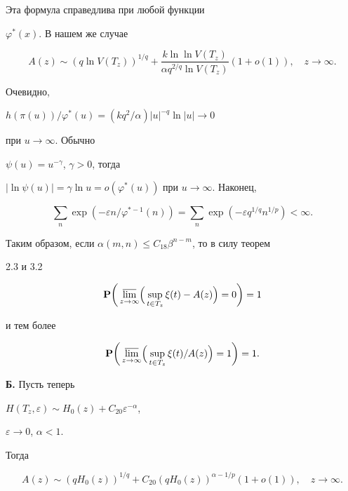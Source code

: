 Эта формула справедлива при любой функции 


$\varphi^*(x)$. В нашем же случае 


$$ 


A(z)\sim(q\ln V(T_z))^{1/q}+ 


\frac{k\ln\ln V(T_z)}{\alpha q^{2/q}\ln V(T_z)} 


(1+o(1)),\quad z\to\infty. 


$$ 


Очевидно, 


$h(\pi(u))/\varphi^*(u)=(kq^2/\alpha)|u|^{-q}\ln|u|\to 0$ 


при $u\to\infty$. Обычно 


$\psi(u)=u^{-\gamma}$, $\gamma>0$, тогда 


$|\ln\psi(u)|=\gamma\ln u=o(\varphi^*(u))$ при $u\to\infty$. Наконец, 


$$ 


\sum_n\exp(-\varepsilon n/\varphi^{*-1}(n))= 


\sum_n\exp(-\varepsilon q^{1/q}n^{1/p})<\infty. 


$$ 


Таким образом, если $\alpha(m,n)\le C_{18}\beta^{n-m}$, то в силу теорем 


2.3 и 3.2 


$$ 


{\bold P}\biggl(\,\underset{z\to\infty}{\varlimsup}\Bigl(\, 


\sup_{t\in T_z}\xi(t)-A(z)\Bigr)=0\biggr)=1 


$$ 


и тем более 


$$ 


{\bold P}\biggl(\,\underset{z\to\infty}{\varlimsup}\Bigl(\, 


\sup_{t\in T_z}\xi(t)/A(z)\Bigr)=1\biggr)=1. 


$$ 


 


{\bf Б.} Пусть теперь 


$H(T_z,\varepsilon)\sim H_0(z)+C_{20}\varepsilon^{-\alpha}$, 


$\varepsilon\to 0$, $\alpha<1$. 


Тогда 


$$ 


A(z)\sim (qH_0(z))^{1/q}+C_{20}(qH_0(z))^{\alpha-1/p} 


(1+o(1)),\quad z\to\infty. 


$$ 


